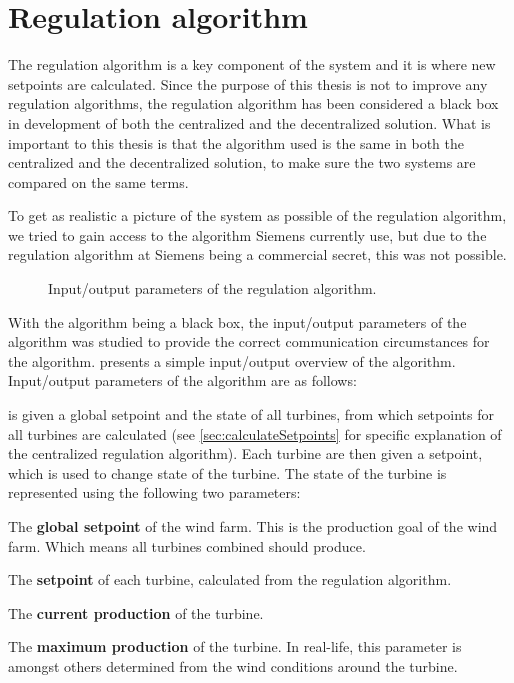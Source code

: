 

\section{Regulation algorithm}\label{sec:regAlgorithm}

The regulation algorithm is a key component of the system and it is where new setpoints are calculated. Since the purpose of this thesis is not to improve any regulation algorithms, the regulation algorithm has been considered a black box in development of both the centralized and the decentralized solution. What is important to this thesis is that the algorithm used is the same in both the centralized and the decentralized solution, to make sure the two systems are compared on the same terms. 

To get as realistic a picture of the system as possible of the regulation algorithm, we tried to gain access to the algorithm Siemens currently use, but due to the regulation algorithm at Siemens being a commercial secret, this was not possible.

\begin{figure}
	\centering
	

	\caption[Regulation algorithm input/output parameters]{
		\label{fig:ioRegAlg} 
		\footnotesize{%
			Input/output parameters of the regulation algorithm.
		}
	}
\end{figure}

With the algorithm being a black box, the input/output parameters of the algorithm was studied to provide the correct communication circumstances for the algorithm.  presents a simple input/output overview of the algorithm. Input/output parameters of the algorithm are as follows:

is given a global setpoint and the state of all turbines, from which setpoints for all turbines are calculated (see \cref{sec:calculateSetpoints} for specific explanation of the centralized regulation algorithm). Each turbine are then given a setpoint, which is used to change state of the turbine. The state of the turbine is represented using the following two parameters:

\begin{description}
	\item The \textbf{global setpoint} of the wind farm. This is the production goal of the wind farm. Which means all turbines combined should produce.
	\item The \textbf{setpoint} of each turbine, calculated from the regulation algorithm. 
	\item The \textbf{current production} of the turbine.
	\item The \textbf{maximum production} of the turbine. In real-life, this parameter is amongst others determined from the wind conditions around the turbine.
\end{description}

